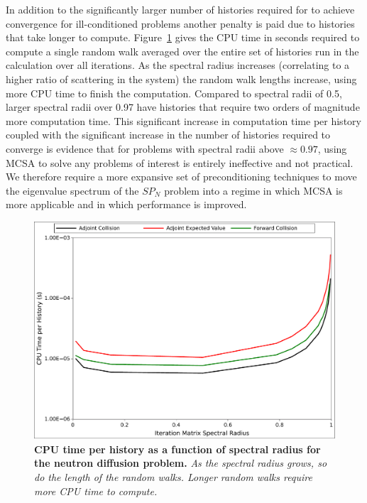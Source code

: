 In addition to the significantly larger number of histories required
for to achieve convergence for ill-conditioned problems another
penalty is paid due to histories that take longer to
compute. Figure~\ref{fig:breakdown_time} gives the CPU time in seconds
required to compute a single random walk averaged over the entire set
of histories run in the calculation over all iterations. As the
spectral radius increases (correlating to a higher ratio of scattering
in the system) the random walk lengths increase, using more CPU time
to finish the computation. Compared to spectral radii of 0.5, larger
spectral radii over 0.97 have histories that require two orders of
magnitude more computation time. This significant increase in
computation time per history coupled with the significant increase in
the number of histories required to converge is evidence that for
problems with spectral radii above $\approx 0.97$, using MCSA to solve
any problems of interest is entirely ineffective and not practical. We
therefore require a more expansive set of preconditioning techniques
to move the eigenvalue spectrum of the $SP_N$ problem into a regime in
which MCSA is more applicable and in which performance is improved.
\begin{figure}[t!]
  \begin{center}
    \includegraphics[width=6in]{chapters/spn_equations/breakdown_time.pdf}
  \end{center}
  \caption{\textbf{CPU time per history as a function of spectral
      radius for the neutron diffusion problem.} \textit{As the
      spectral radius grows, so do the length of the random
      walks. Longer random walks require more CPU time to compute.}}
  \label{fig:breakdown_time}
\end{figure}

